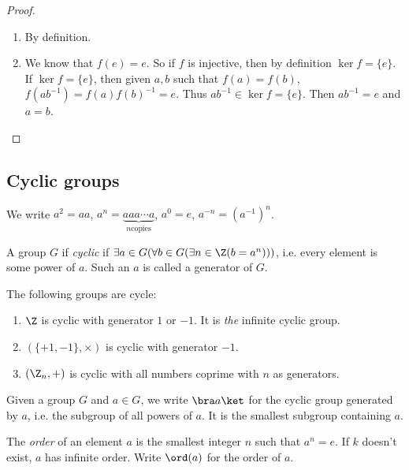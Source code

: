 \documentclass[a4pape]{article}
\begin{document}
\begin{proof}\leavevmode
  \begin{enumerate}
  \item By definition.
  \item We know that $f(e) = e$. So if $f$ is injective, then by definition $\ker f = \{e\}$. If $\ker f = \{e\}$, then given $a, b$ such that $f(a) = f(b)$, $f(ab^{-1}) = f(a)f(b)^{-1} = e$. Thus $ab^{-1}\in \ker f = \{e\}$.  Then $ab^{-1} = e$ and $a = b$.
  \end{enumerate}
\end{proof}

\subsection{Cyclic groups}
\begin{notation}
  We write $a^2 = aa$, $a^n = \underbrace{aaa\cdots a}_{n \text{copies}}$, $a^0 = e$, $a^{-n} = (a^{-1})^n$.
\end{notation}

\begin{defi}
  A group $G$ if \emph{cyclic} if $\exists a\in G(\forall b\in G(\exists n\in\Z(b=a^n)))$, i.e. every element is some power of $a$. Such an $a$ is called a generator of $G$.
\end{defi}

\begin{eg}
  The following groups are cycle:
  \begin{enumerate}
  \item $\Z$ is cyclic with generator $1$ or $-1$. It is \emph{the} infinite cyclic group.
  \item $(\{+1, -1\}, \times)$ is cyclic with generator $-1$.
  \item $(\Z_n, +)$ is cyclic with all numbers coprime with $n$ as generators.
  \end{enumerate}
\end{eg}

\begin{notation}
  Given a group $G$ and $a\in G$, we write $\bra a\ket$ for the cyclic group generated by $a$, i.e. the subgroup of all powers of $a$. It is the smallest subgroup containing $a$.
\end{notation}

\begin{defi}
  The \emph{order} of an element $a$ is the smallest integer $n$ such that $a^n = e$. If $k$ doesn't exist, $a$ has infinite order. Write $\ord(a)$ for the order of $a$.
\end{defi}
\end{document}
